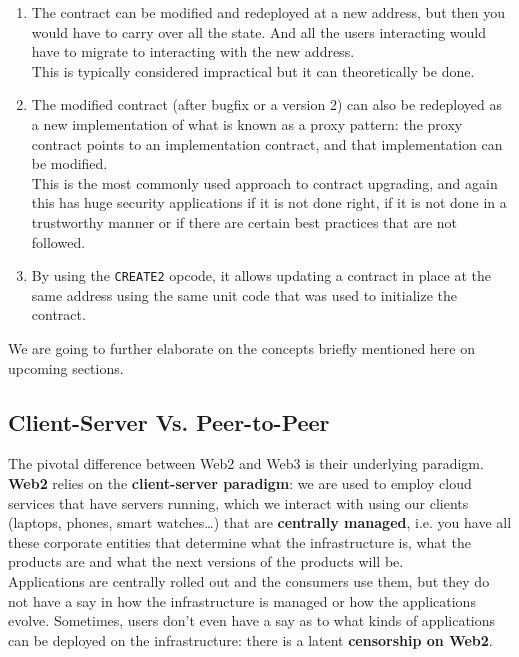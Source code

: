 \begin{enumerate}

    \item The contract can be modified and redeployed at a new address, but then you would have to carry over all the state.
    And all the users interacting would have to migrate to interacting with the new address.\\

    This is typically considered impractical but it can theoretically be done.

    \item The modified contract (after bugfix or a version 2) can also be redeployed as a new implementation of what is known as a proxy pattern: the proxy contract points to an implementation contract, and that implementation can be modified.\\
    
    This is the most commonly used approach to contract upgrading, and again this has huge security applications if it is not done right, if it is not done in a trustworthy manner or if there are certain best practices that are not followed.

    \item By using the \texttt{CREATE2} opcode, it allows updating a contract in place at the same address using the same unit code that was used to initialize the contract.

\end{enumerate}

We are going to further elaborate on the concepts briefly mentioned here on upcoming sections.

\subsection*{Client-Server Vs. Peer-to-Peer}

The pivotal difference between Web2 and Web3 is their underlying paradigm.\\

\textbf{Web2} relies on the \textbf{client-server paradigm}: we are used to employ cloud services that have servers running, which we interact with using our clients (laptops, phones, smart watches\dots) that are \textbf{centrally managed}, i.e. you have all these corporate entities that determine what the infrastructure is, what the products are and what the next versions of the products will be.\\

Applications are centrally rolled out and the consumers use them, but they do not have a say in how the infrastructure is managed or how the applications evolve.
Sometimes, users don't even have a say as to what kinds of applications can be deployed on the infrastructure: there is a latent \textbf{censorship on Web2}.\\

